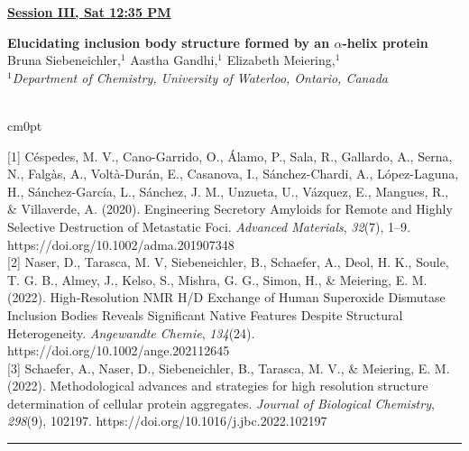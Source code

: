 \documentclass[titlepage,oneside,openany,10pt]{book}
\newenvironment{oralabswrefwfig}[8] %
        {
        \newcommand{\oralref}{#5}
	\FPeval{\cutw}{clip(16.7-#7)}
	\FPeval{\cutl}{round(#8/0.35,3)}
        \begin{flushright}
                \underline{\textbf{#4}}
        \end{flushright}
        \textbf{#1}\\%
        #2\\%
        \textit{#3}\\\\%
        \def\windowpagestuff{\centering
                \texttt{[image: \#6]}}
        \opencutright
        \begin{cutout}{0}{\cutw cm}{0pt}{\RoundingUpFunction{\cutl}}
        \noindent
        }
        {
        \end{cutout}
        \vspace{0.5cm}
        \noindent \oralref \\ \noindent\rule{15cm}{0.5pt}%
        }
\begin{document}
\vspace{1cm}

\begin{oralabswrefwfig}
    {Elucidating inclusion body structure formed by an $\alpha$-helix protein}
    {Bruna Siebeneichler,$^{1}$ Aastha Gandhi,$^{1}$ Elizabeth Meiering,$^{1}$}
    {
    $^1$Department of Chemistry, University of Waterloo, Ontario, Canada
    }
    {Session III, Sat 12:35 PM}
    {
    {[1]} C\'{e}spedes, M. V., Cano-Garrido, O., Álamo, P., Sala, R., Gallardo, A., Serna, N., Falgàs, A., Voltà-Durán, E., Casanova, I., Sánchez-Chardi, A., López-Laguna, H., Sánchez-García, L., Sánchez, J. M., Unzueta, U., Vázquez, E., Mangues, R., \& Villaverde, A. (2020). Engineering Secretory Amyloids for Remote and Highly Selective Destruction of Metastatic Foci. \emph{Advanced Materials}, \emph{32}(7), 1--9. https://doi.org/10.1002/adma.201907348\\
    {[2]} Naser, D., Tarasca, M. V, Siebeneichler, B., Schaefer, A., Deol, H. K., Soule, T. G. B., Almey, J., Kelso, S., Mishra, G. G., Simon, H., \& Meiering, E. M. (2022). High‐Resolution NMR H/D Exchange of Human Superoxide Dismutase Inclusion Bodies Reveals Significant Native Features Despite Structural Heterogeneity. \emph{Angewandte Chemie}, \emph{134}(24). https://doi.org/10.1002/ange.202112645\\
    {[3]} Schaefer, A., Naser, D., Siebeneichler, B., Tarasca, M. V., \& Meiering, E. M. (2022). Methodological advances and strategies for high resolution structure determination of cellular protein aggregates. \emph{Journal of Biological Chemistry}, \emph{298}(9), 102197. https://doi.org/10.1016/j.jbc.2022.102197
    }
    {abstract_figures/Siebeneichler_Bruna_Oral.jpg}
    {11.0}
    {5.0}

\end{oralabswrefwfig}
\end{document}
